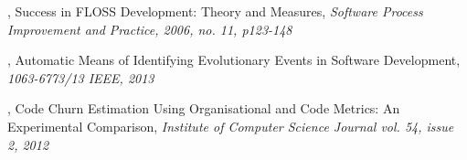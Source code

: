 \begin{thebibliography}{99}
	 \rm,
		Success in FLOSS Development: Theory and Measures, \emph{Software Process
		Improvement and Practice, 2006, no. 11, p123-148}\rm

\begin{comment}
		Crowston et al. studied the success of FLOSS projects. They reconsider what
		success means in a FLOSS context. They elaborated on the literature study
		conducted in \cite{crowston2003} and extended this conclusions by a critical
		evaluation on the measures defined therein.
		
		These new insights are useful in defining metrics to determine a project's
		health and activity.
\end{comment}
	
	 \rm, Automatic Means of Identifying
		Evolutionary Events in Software Development, \emph{1063-6773/13 IEEE, 2013}\rm

\begin{comment}
		This is the base paper of the Master's project.
		Karus has explored the usage of wavelet transforms for the analysis of OSS
		projects evolution. Karus was able to detect close to 1,000 similar patterns
		in a subset of 27 OSS projects. In conclusion, the analysis reveals that
		wavelet analysis can be a powerful and objective tool for identifying
		evolutionary events that can be used as estimation basis or management guide
		in software projects.

		During this Master's project I will replicate and extend the work of Karus by
		comparing patterns and events in order to validate wavelet analysis as a tool
		to predict end of software evolution. This will be done using a larger data
		set and a critical validation of the results found in the base paper.
\end{comment}

	 \rm, Code Churn Estimation
		Using Organisational and Code Metrics: An Experimental Comparison,
		\emph{Institute of Computer Science Journal vol. 54, issue 2, 2012}\rm

\begin{comment}
		Karus and Dumas studied a means to estimate future code maintenance effort in
		order to plan software maintenance activities. In this paper they used machine
		learning techniques to unveil predictors of yearly cumulative code churn of
		software projects on the basis of metrics extracted from version control
		systems. They have shown that a code churn estimation model built purely with
		organisational metrics is superior to one built purely with code metrics.
		However, a combined model provides the highest predictive power. Code metrics
		in general are complementary to organisational metrics for the purpose of
		estimating code churn.


\end{comment}
\end{thebibliography}
